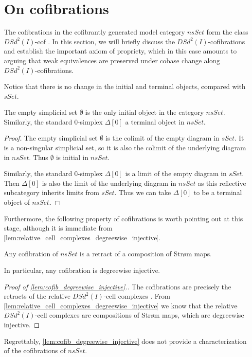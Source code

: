 

\section{On cofibrations}
\label{sec:cofib}

The cofibrations in the cofibrantly generated model category $nsSet$ form the class $DSd^2(I)$-cof \cite[Prop.~11.2.1~(1)]{Hi03}. In this section, we will briefly discuss the $DSd^2(I)$-cofibrations and establish the important axiom of propriety, which in this case amounts to arguing that weak equivalences are preserved under cobase change along $DSd^2(I)$-cofibrations.

Notice that there is no change in the initial and terminal objects, compared with $sSet$.
\begin{lemma}
The empty simplicial set $\emptyset$ is the only initial object in the category $nsSet$. Similarly, the standard $0$-simplex $\Delta [0]$ a terminal object in $nsSet$.
\end{lemma}
\begin{proof}
The empty simplicial set $\emptyset$ is the colimit of the empty diagram in $sSet$. It is a non-singular simplicial set, so it is also the colimit of the underlying diagram in $nsSet$. Thus $\emptyset$ is initial in $nsSet$.

Similarly, the standard $0$-simplex $\Delta [0]$ is a limit of the empty diagram in $sSet$. Then $\Delta [0]$ is also the limit of the underlying diagram in $nsSet$ as this reflective subcategory inherits limits from $sSet$. Thus we can take $\Delta [0]$ to be a terminal object of $nsSet$.
\end{proof}
\noindent Furthermore, the following property of cofibrations is worth pointing out at this stage, although it is immediate from \cref{lem:relative_cell_complexes_degreewise_injective}.
\begin{lemma}\label{lem:cofib_degreewise_injective}
Any cofibration of $nsSet$ is a retract of a composition of Str\o m maps.
\end{lemma}
\noindent In particular, any cofibration is degreewise injective.
\begin{proof}[Proof of \cref{lem:cofib_degreewise_injective}.]
The cofibrations are precisely the retracts of the relative $DSd^2(I)$-cell complexes \cite[Prop.~11.2.1.~(1),~p.~211]{Hi03}. From \cref{lem:relative_cell_complexes_degreewise_injective} we know that the relative $DSd^2(I)$-cell complexes are compositions of Str\o m maps, which are degreewise injective.
\end{proof}
\noindent Regrettably, \cref{lem:cofib_degreewise_injective} does not provide a characterization of the cofibrations of $nsSet$.


